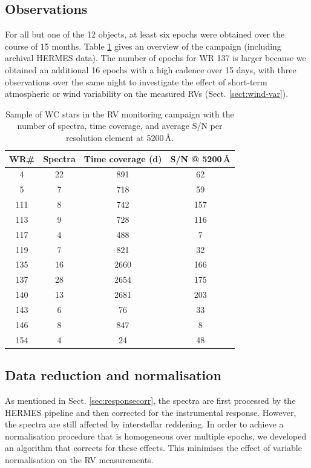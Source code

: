 \subsection{Observations}
For all but one of the 12 objects, at least six epochs were obtained over the course of 15 months. Table \ref{tab:epochs} \b{gives an overview} of the campaign (including archival HERMES data). The number of epochs for WR 137 is larger because we obtained an additional 16 epochs with a high cadence over 15 days, with three observations over the same night to investigate the effect of short-term atmospheric or wind variability on the measured RVs (Sect. \ref{sect:wind-var}).
\begin{table}
\centering
\caption{Sample of WC stars in the RV monitoring campaign with the number of spectra, time coverage, and average S/N per resolution element at 5200\,\r{A}.}
\begin{tabular}{cccc}
\hline \hline
WR\# & Spectra & Time coverage (d) & S/N @ 5200\,\r{A} \\ \hline
4 & 22 & 891 & 62 \\
5 & 7 & 718 & 59 \\
111 & 8 & 742 & 157 \\
113 & 9 & 728 & 116 \\
117 & 4 & 488 & 7 \\
119 & 7 & 821 & 32 \\
135 & 16 & 2660 & 166 \\
137 & 28 & 2654 & 175 \\
140 & 13 & 2681 & 203 \\
143 & 6 & 76 & 33 \\
146 & 8 & 847 & 8 \\
154 & 4 & 24 & 48 \\ \hline
\end{tabular}
\label{tab:epochs}
\end{table}

\subsection{Data reduction and normalisation}
As mentioned in Sect. \ref{sec:responsecorr}, the spectra are first processed by the HERMES pipeline and then corrected for the instrumental response. However, the spectra are still affected by interstellar reddening. In order to achieve a normalisation procedure that is homogeneous over multiple epochs, we developed an algorithm that corrects for these effects. This minimises the effect of variable normalisation on the RV measurements.


